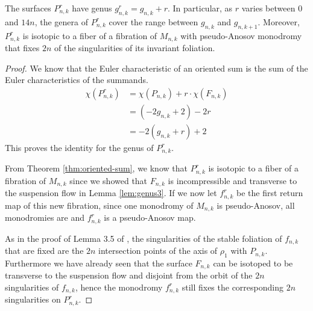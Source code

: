 \begin{lem}
  The surfaces $P^r_{n,k}$ have genus $g^r_{n,k} = g_{n,k} + r$. In particular, as $r$ varies between
  $0$ and $14n$, the genera of $P^r_{n,k}$ cover the range between $g_{n,k}$ and $g_{n,k+1}$. Moreover,
  $P^r_{n,k}$ is isotopic to a fiber of a fibration of $M_{n,k}$ with pseudo-Anosov monodromy that fixes $2n$
  of the singularities of its invariant foliation.
\end{lem}

\begin{proof}
  We know that the Euler characteristic of an oriented sum is the sum of the Euler characteristics of the summands.
  \begin{align*}
    \chi(P^r_{n,k}) &= \chi(P_{n,k}) + r\cdot\chi(F_{n,k}) \\
                    &= (-2g_{n,k} + 2)-2r \\
                    &= -2(g_{n,k} + r) + 2
  \end{align*}
  This proves the identity for the genus of $P^r_{n,k}.$

  From Theorem \ref{thm:oriented-sum}, we know that $P^r_{n,k}$ is isotopic to a fiber of a fibration of
  $M_{n,k}$ since we showed that $F_{n,k}$ is incompressible and transverse to the suspension flow in Lemma
  \ref{lem:genus3}. If we now let $f^r_{n,k}$ be the first return map of this new fibration, since one
  monodromy of $M_{n,k}$ is pseudo-Anosov, all monodromies are and $f^r_{n,k}$ is a pseudo-Anosov map.

  As in the proof of Lemma 3.5 of \cite{yazdi2018pseudo}, the singularities of the stable foliation of
  $f_{n,k}$ that are fixed are the $2n$ intersection points of the axis of $\rho_1$ with
  $P_{n,k}$. Furthermore we have already seen that the surface $F_{n,k}$ can be isotoped to be transverse to
  the suspension flow and disjoint from the orbit of the $2n$ singularities of $f_{n,k}$, hence the monodromy
  $f^r_{n,k}$ still fixes the corresponding $2n$ singularities on $P^r_{n,k}$.
\end{proof}


